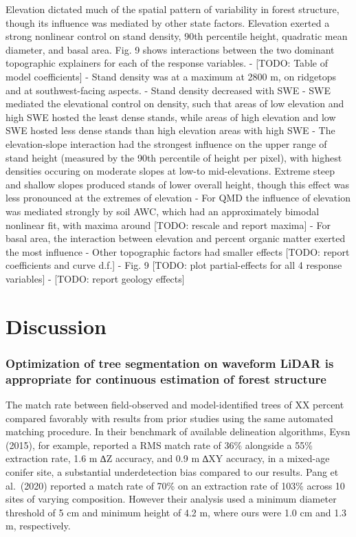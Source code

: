 \documentclass[
  12pt,
]{article}
\begin{document}
Elevation dictated much of the spatial pattern of variability in forest
structure, though its influence was mediated by other state factors.
Elevation exerted a strong nonlinear control on stand density, 90th
percentile height, quadratic mean diameter, and basal area. Fig. 9 shows
interactions between the two dominant topographic explainers for each of
the response variables. - {[}TODO: Table of model coefficients{]} -
Stand density was at a maximum at 2800 m, on ridgetops and at
southwest-facing aspects. - Stand density decreased with SWE - SWE
mediated the elevational control on density, such that areas of low
elevation and high SWE hosted the least dense stands, while areas of
high elevation and low SWE hosted less dense stands than high elevation
areas with high SWE - The elevation-slope interaction had the strongest
influence on the upper range of stand height (measured by the 90th
percentile of height per pixel), with highest densities occuring on
moderate slopes at low-to mid-elevations. Extreme steep and shallow
slopes produced stands of lower overall height, though this effect was
less pronounced at the extremes of elevation - For QMD the influence of
elevation was mediated strongly by soil AWC, which had an approximately
bimodal nonlinear fit, with maxima around {[}TODO: rescale and report
maxima{]} - For basal area, the interaction between elevation and
percent organic matter exerted the most influence - Other topographic
factors had smaller effects {[}TODO: report coefficients and curve
d.f.{]} - Fig. 9 {[}TODO: plot partial-effects for all 4 response
variables{]} - {[}TODO: report geology effects{]}

\section{Discussion}\label{discussion}

\subsubsection{Optimization of tree segmentation on waveform LiDAR is
appropriate for continuous estimation of forest
structure}\label{optimization-of-tree-segmentation-on-waveform-lidar-is-appropriate-for-continuous-estimation-of-forest-structure}

The match rate between field-observed and model-identified trees of XX
percent compared favorably with results from prior studies using the
same automated matching procedure. In their benchmark of available
delineation algorithms, Eysn (2015), for example, reported a RMS match
rate of 36\% alongside a 55\% extraction rate, 1.6 m ∆Z accuracy, and
0.9 m ∆XY accuracy, in a mixed-age conifer site, a substantial
underdetection bias compared to our results. Pang et al.~(2020) reported
a match rate of 70\% on an extraction rate of 103\% across 10 sites of
varying composition. However their analysis used a minimum diameter
threshold of 5 cm and minimum height of 4.2 m, where ours were 1.0 cm
and 1.3 m, respectively.
\end{document}
